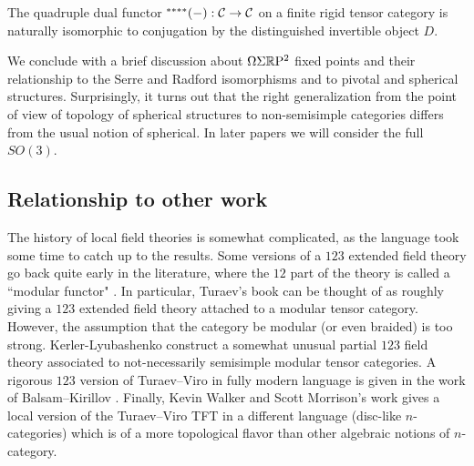 \documentclass{amsart}
\begin{document}
\begin{maincor}
The quadruple dual functor ${}^{****}(-): \mathcal C \rightarrow \mathcal C$ on a finite rigid tensor category is naturally isomorphic to conjugation by the distinguished invertible object $D$.
\end{maincor}

We conclude with a brief discussion about $\Omega \Sigma \mathbb R \mathrm{P}^2$ fixed points and their relationship to the Serre and Radford isomorphisms and to pivotal and spherical structures.  Surprisingly, it turns out that the right generalization from the point of view of topology of spherical structures to non-semisimple categories differs from the usual notion of spherical.  In later papers we will consider the full $SO(3)$.



\subsection*{Relationship to other work}


The history of local field theories is somewhat complicated, as the language took some time to catch up to the results.  Some versions of a $123$ extended field theory go back quite early in the literature, where the $12$ part of the theory is called a ``modular functor" \cite{Segal, MR1002038, MR1159969,MR1797619}.  In particular, Turaev's book \cite{MR1292673} can be thought of as roughly giving a $123$ extended field theory attached to a modular tensor category.  However, the assumption that the category be modular (or even braided) is too strong.  Kerler-Lyubashenko \cite{MR1862634} construct a somewhat unusual partial $123$ field theory associated to not-necessarily semisimple modular tensor categories.   A rigorous $123$ version of Turaev--Viro in fully modern language is given in the work of Balsam--Kirillov \cite{1004.1533}.  Finally, Kevin Walker and Scott Morrison's work \cite{kw:tqft, 1009.5025} gives a local version of the Turaev--Viro TFT in a different language (disc-like $n$-categories) which is of a more topological flavor than other algebraic notions of $n$-category.
\end{document}
